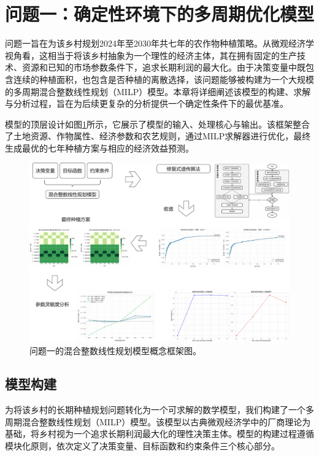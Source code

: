 \section{问题一：确定性环境下的多周期优化模型}

问题一旨在为该乡村规划2024年至2030年共七年的农作物种植策略。从微观经济学视角看，这相当于将该乡村抽象为一个理性的经济主体，其在拥有固定的生产技术、资源和已知的市场参数条件下，追求长期利润的最大化。由于决策变量中既包含连续的种植面积，也包含是否种植的离散选择，该问题能够被构建为一个大规模的多周期混合整数线性规划（MILP）模型。本章将详细阐述该模型的构建、求解与分析过程，旨在为后续更复杂的分析提供一个确定性条件下的最优基准。

模型的顶层设计如图\ref{fig:milp_framework}所示，它展示了模型的输入、处理核心与输出。该框架整合了土地资源、作物属性、经济参数和农艺规则，通过MILP求解器进行优化，最终生成最优的七年种植方案与相应的经济效益预测。

\begin{figure}[htbp]
	\centering
	\includegraphics[width=\textwidth]{figs/3问题一/问题一框架.pdf}
	\caption{问题一的混合整数线性规划模型概念框架图。}
	\label{fig:milp_framework}
\end{figure}

\subsection{模型构建}


为将该乡村的长期种植规划问题转化为一个可求解的数学模型，我们构建了一个多周期混合整数线性规划（MILP）模型。该模型以古典微观经济学中的厂商理论为基础，将乡村视为一个追求长期利润最大化的理性决策主体。模型的构建过程遵循模块化原则，依次定义了决策变量、目标函数和约束条件三个核心部分。

